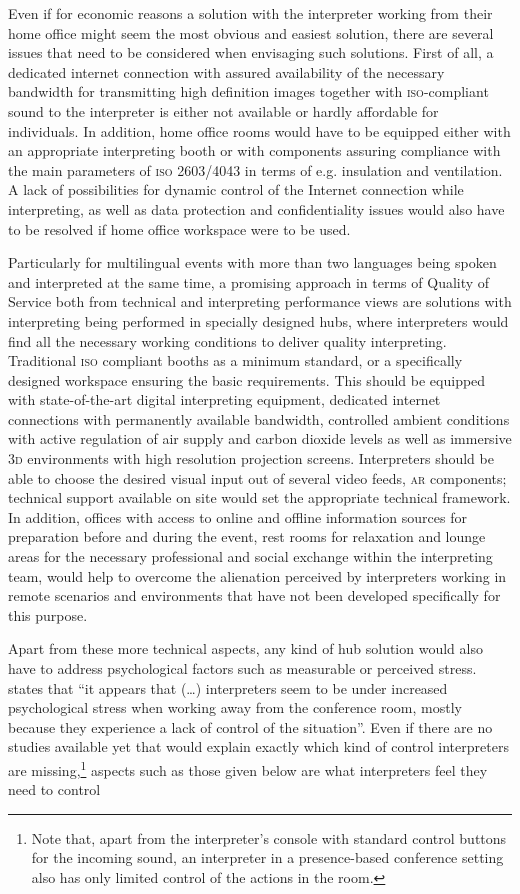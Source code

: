 \documentclass[output=paper]{langsci/langscibook}
\begin{document}
Even if for economic reasons a solution with the interpreter working from their home office might seem the most obvious and easiest solution, there are several issues that need to be considered when envisaging such solutions. First of all, a dedicated internet connection with assured availability of the necessary bandwidth for transmitting high definition images together with \textsc{iso}-compliant sound to the interpreter is either not available or hardly affordable for individuals. In addition, home office rooms would have to be equipped either with an appropriate interpreting booth or with components assuring compliance with the main parameters of \textsc{iso 2603\slash4043} in terms of e.g. insulation and ventilation. A lack of possibilities for dynamic control of the Internet connection while interpreting, as well as data protection and confidentiality issues would also have to be resolved if home office workspace were to be used.

Particularly for multilingual events with more than two languages being spoken and interpreted at the same time, a promising approach in terms of Quality of Service both from technical and interpreting performance views are solutions with interpreting being performed in specially designed hubs, where interpreters would find all the necessary working conditions to deliver quality interpreting. Traditional \textsc{iso} compliant booths as a minimum standard, or a specifically designed workspace ensuring the basic requirements. This should be equipped with state-of-the-art digital interpreting equipment, dedicated internet connections with permanently available bandwidth, controlled ambient conditions with active regulation of air supply and carbon dioxide levels as well as immersive \textsc{3d} environments with high resolution projection screens. Interpreters should be able to choose the desired visual input out of several video feeds, \textsc{ar} components; technical support available on site would set the appropriate technical framework. In addition, offices with access to online and offline information sources for preparation before and during the event, rest rooms for relaxation and lounge areas for the necessary professional and social exchange within the interpreting team, would help to overcome the alienation perceived by interpreters working in remote scenarios and environments that have not been developed specifically for this purpose. 

\largerpage
Apart from these more technical aspects, any kind of hub solution would also have to address psychological factors such as measurable or perceived stress. \citet[15]{Moser-Mercer2005} states that “it appears that (…) interpreters seem to be under increased psychological stress when working away from the conference room, mostly because they experience a lack of control of the situation”. Even if there are no studies available yet that would explain exactly which kind of control interpreters are missing,\footnote{Note that, apart from the interpreter’s console with standard control buttons for the incoming sound, an interpreter in a presence-based conference setting also has only limited control of the actions in the room.} aspects such as those given below are what interpreters feel they need to control
\end{document}
